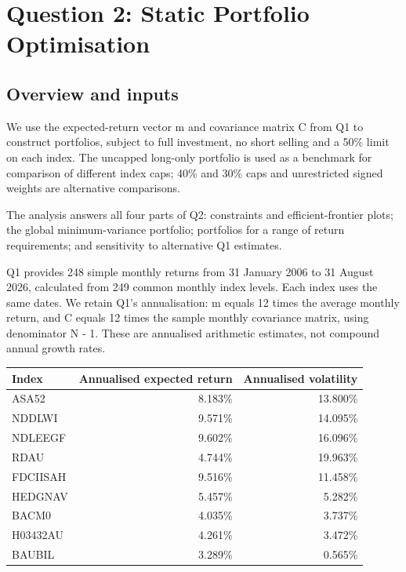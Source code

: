 \documentclass[
  10pt,
  a4paper,
]{article}
\author{}
\date{}
\begin{document}
\hypertarget{question-2-static-portfolio-optimisation}{%
\section{Question 2: Static Portfolio
Optimisation}\label{question-2-static-portfolio-optimisation}}

\hypertarget{overview-and-inputs}{%
\subsection{Overview and inputs}\label{overview-and-inputs}}

We use the expected-return vector m and covariance matrix C from Q1 to
construct portfolios, subject to full investment, no short selling and a
50\% limit on each index. The uncapped long-only portfolio is used as a
benchmark for comparison of different index caps; 40\% and 30\% caps and
unrestricted signed weights are alternative comparisons.

The analysis answers all four parts of Q2: constraints and
efficient-frontier plots; the global minimum-variance portfolio;
portfolios for a range of return requirements; and sensitivity to
alternative Q1 estimates.

Q1 provides 248 simple monthly returns from 31 January 2006 to 31 August
2026, calculated from 249 common monthly index levels. Each index uses
the same dates. We retain Q1's annualisation: m equals 12 times the
average monthly return, and C equals 12 times the sample monthly
covariance matrix, using denominator N - 1. These are annualised
arithmetic estimates, not compound annual growth rates.

\begin{longtable}[]{@{}lrr@{}}
\toprule\noalign{}
Index & Annualised expected return & Annualised volatility \\
\midrule\noalign{}
\endhead
\bottomrule\noalign{}
\endlastfoot
ASA52 & 8.183\% & 13.800\% \\
NDDLWI & 9.571\% & 14.095\% \\
NDLEEGF & 9.602\% & 16.096\% \\
RDAU & 4.744\% & 19.963\% \\
FDCIISAH & 9.516\% & 11.458\% \\
HEDGNAV & 5.457\% & 5.282\% \\
BACM0 & 4.035\% & 3.737\% \\
H03432AU & 4.261\% & 3.472\% \\
BAUBIL & 3.289\% & 0.565\% \\
\end{longtable}
\end{document}
